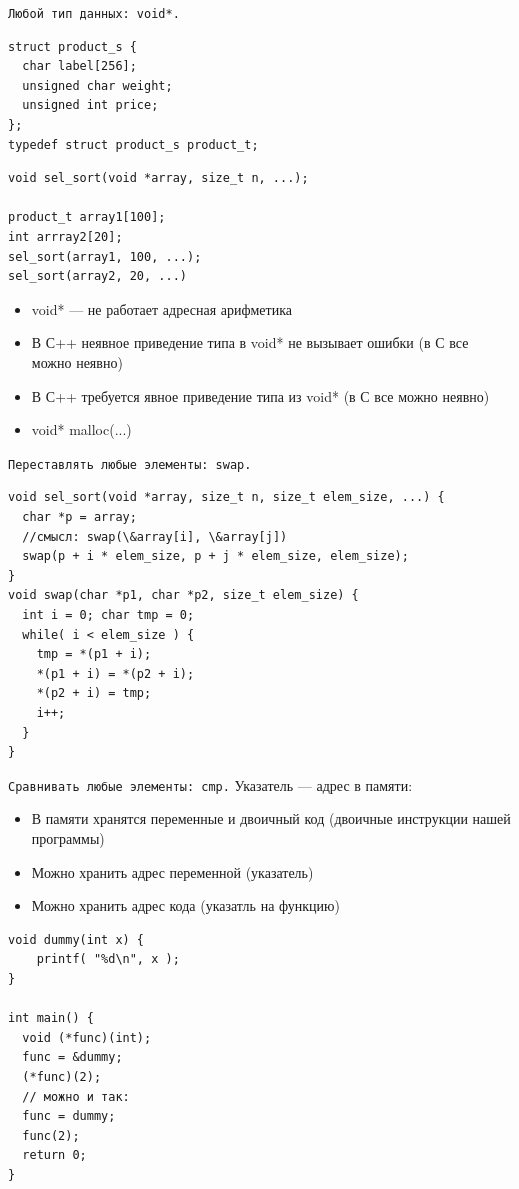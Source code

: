 \documentclass[pdf, 10pt, unicode]{beamer}
\begin{document}
\begin{frame}[fragile]{{\tt Любой тип данных: void*.}}
\begin{lstlisting}
struct product_s {
  char label[256];
  unsigned char weight;
  unsigned int price;
};
typedef struct product_s product_t;
\end{lstlisting}

\begin{lstlisting}
void sel_sort(void *array, size_t n, ...);

product_t array1[100];
int arrray2[20];
sel_sort(array1, 100, ...);
sel_sort(array2, 20, ...)
\end{lstlisting}

\begin{itemize}
  \item void* --- не работает адресная арифметика
  \item В С++ неявное приведение типа в void* не вызывает ошибки (в С все можно неявно)
  \item В С++ требуется явное приведение типа из void* (в С все можно неявно)
  \item void* malloc(...)
\end{itemize}

\end{frame}

\begin{frame}[fragile]{{\tt Переставлять любые элементы: swap.}}
\begin{lstlisting}
void sel_sort(void *array, size_t n, size_t elem_size, ...) {
  char *p = array;
  //смысл: swap(\&array[i], \&array[j])
  swap(p + i * elem_size, p + j * elem_size, elem_size);
}
void swap(char *p1, char *p2, size_t elem_size) {
  int i = 0; char tmp = 0;
  while( i < elem_size ) {
    tmp = *(p1 + i);
    *(p1 + i) = *(p2 + i);
    *(p2 + i) = tmp;
    i++;
  }
}
\end{lstlisting}
\end{frame}

\begin{frame}[fragile]{{\tt Сравнивать любые элементы: cmp.}}
Указатель --- адрес в памяти:
\begin{itemize}
  \item В памяти хранятся переменные и двоичный код (двоичные инструкции нашей программы)
  \item Можно хранить адрес переменной (указатель)
  \item Можно хранить адрес кода (указатль на функцию)
\end{itemize}
\begin{lstlisting}
void dummy(int x) {
    printf( "%d\n", x );
}

int main() {
  void (*func)(int);
  func = &dummy;
  (*func)(2);
  // можно и так:
  func = dummy;
  func(2);
  return 0;
}
\end{lstlisting}
\end{frame}
\end{document}
